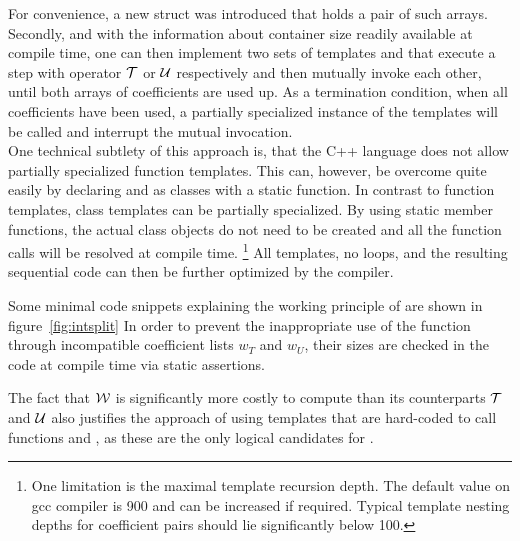 For convenience, a new struct  was introduced that holds a pair of such arrays.
Secondly, and with the information about container size readily available at compile time, one can then implement two sets of templates  and  that execute a step with operator $\mathcal{T}$ or $\mathcal{U}$ respectively and then mutually invoke each other, until both arrays of coefficients are used up.
As a termination condition, when all coefficients have been used, a partially specialized instance of the templates will be called and interrupt the mutual invocation. \\
%
One technical subtlety of this approach is, that the C++ language does not allow partially specialized function templates. This can, however, be overcome quite easily by declaring  and  as classes with a static function.
In contrast to function templates, class templates can be partially specialized.
By using static member functions, the actual class objects do not need to be created and all the function calls will be resolved at compile time.
\footnote{One limitation is the maximal template recursion depth. The default value on gcc compiler is 900 and can be increased if required. Typical template nesting depths for coefficient pairs should lie significantly below 100.}
All templates, no loops, and the resulting sequential code can then be further optimized by the compiler.
\par\medskip
%
Some minimal code snippets explaining the working principle of  are shown in figure~\ref{fig:intsplit}
%
In order to prevent the inappropriate use of the  function through incompatible coefficient lists $w_T$ and $w_U$, their sizes are checked in the code at compile time via static assertions.
\par\medskip
%
The fact that $\mathcal{W}$ is significantly more costly to compute than its counterparts $\mathcal{T}$ and $\mathcal{U}$ also justifies the approach of using templates that are hard-coded to call functions  and , as these are the only logical candidates for .

